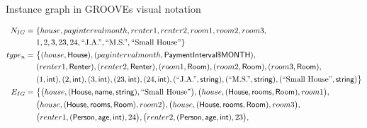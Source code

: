 \begin{figure}[p]
    \centering
    \begin{subfigure}{\textwidth}
        \centering
        
        \caption{Instance graph in GROOVEs visual notation}
    \end{subfigure}
    
    \begin{subfigure}{\textwidth}
        \centering
        \begin{align*}
            N_{IG} =\ & \{ 
                house,
                payintervalmonth,
                renter1,
                renter2,
                room1,
                room2,
                room3,\\&
                1,
                2,
                3,
                23,
                24,
                \text{``J.A.''},
                \text{``M.S.''},
                \text{``Small House''}
            \}\\
            type_n =\ & \big\{
                ( house, \type{House} ),
                ( payintervalmonth, \type{PaymentInterval\$MONTH} ),\\&
                ( renter1, \type{Renter} ),
                ( renter2, \type{Renter} ),
                ( room1, \type{Room} ),
                ( room2, \type{Room} ),
                ( room3, \type{Room} ),\\&
                ( 1, \type{int} ),
                ( 2, \type{int} ),
                ( 3, \type{int} ),
                ( 23, \type{int} ),
                ( 24, \type{int} ),
                ( \text{``J.A.''}, \type{string} ),
                ( \text{``M.S.''}, \type{string} ),
                ( \text{``Small House''}, \type{string} )
            \big\}\\
            E_{IG} =\ & \big\{ 
                \big( house, ( \type{House}, \type{name}, \type{string} ), \text{``Small House''} \big),
                \big( house, ( \type{House}, \type{rooms}, \type{Room} ), room1 \big),\\&
                \big( house, ( \type{House}, \type{rooms}, \type{Room} ), room2 \big),
                \big( house, ( \type{House}, \type{rooms}, \type{Room} ), room3 \big),\\&
                \big( renter1, ( \type{Person}, \type{age}, \type{int} ), 24 \big),
                \big( renter2, ( \type{Person}, \type{age}, \type{int} ), 23 \big),\\&

\end{align*}
\end{subfigure}
\end{figure}
